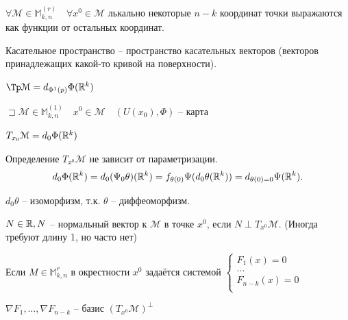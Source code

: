 \begin{corollary}
    $\forall \mathcal M \in \mathbb M_{k,n}^{(r)}\quad \forall x^0\in \mathcal M$ лькально некоторые $n-k$ координат точки выражаются как функции от остальных координат.
\end{corollary}

\begin{note}
  Касательное пространство -- пространство касательных векторов (векторов принадлежащих какой-то кривой на поверхности).

    $\Tp \mathcal M = d_{\Phi^1(p)}\Phi(\R^k)$
\end{note}

\begin{definition}
    $\sqsupset \mathcal M \in \mathbb M_{k, n}^{(1)}\quad x^0\in \mathcal M\quad (U(x_0), \Phi)$ -- карта

    $T_{x_0}\mathcal M = d_0\Phi(\mathbb{R}^k)$
\end{definition}

\begin{note}
    Определение $T_{x^0}\mathcal M$ не зависит от параметризации.
    \[
    d_0\Phi(\mathbb{R}^k) = d_0(\Psi_0\theta)(\mathbb{R}^k) = f_{\theta(0)}\Psi(d_0\theta (\mathbb{R}^k))  = d_{\theta(0) = 0}\Psi(\mathbb{R}^k)
    .\]

    $d_0\theta$ -- изоморфизм, т.к. $\theta$ -- диффеоморфизм.
\end{note}

\begin{note}
    $N \in \mathbb{R}, N$ -- нормальный вектор к $\mathcal M$  в точке $x^0$, если $N \perp T_{x^0}\mathcal M$. (Иногда требуют длину 1, но часто нет)
\end{note}
\begin{note}
    Если $M\in \mathbb M_{k,n}^r$ в окрестности $x^0$ задаётся системой $\begin{cases}
        F_1(x) = 0\\
        \ldots\\
        F_{n-k}(x) = 0\\
    \end{cases}$

    $\nabla F_1, \ldots, \nabla F_{n-k}$ -- базис $(T_{x^0} \mathcal M)^{\perp}$

\end{note}

